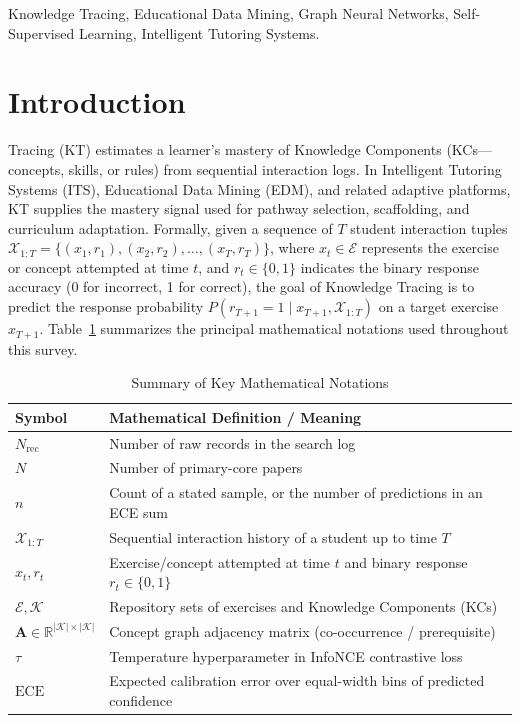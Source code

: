 \documentclass[lettersize,journal]{IEEEtran}
\begin{document}
\begin{IEEEkeywords}
Knowledge Tracing, Educational Data Mining, Graph Neural Networks, Self-Supervised Learning, Intelligent Tutoring Systems.
\end{IEEEkeywords}

\section{Introduction}
\label{sec:intro}

 Tracing (KT) estimates a learner's mastery of Knowledge Components (KCs---concepts, skills, or rules) from sequential interaction logs. In Intelligent Tutoring Systems (ITS), Educational Data Mining (EDM), and related adaptive platforms, KT supplies the mastery signal used for pathway selection, scaffolding, and curriculum adaptation. Formally, given a sequence of $T$ student interaction tuples $\mathcal{X}_{1:T} = \{(x_1, r_1), (x_2, r_2), \dots, (x_T, r_T)\}$, where $x_t \in \mathcal{E}$ represents the exercise or concept attempted at time $t$, and $r_t \in \{0, 1\}$ indicates the binary response accuracy (0 for incorrect, 1 for correct), the goal of Knowledge Tracing is to predict the response probability $P(r_{T+1} = 1 \mid x_{T+1}, \mathcal{X}_{1:T})$ on a target exercise $x_{T+1}$. Table~\ref{tab:notation_summary} summarizes the principal mathematical notations used throughout this survey.
\begin{table}[t]
\caption{Summary of Key Mathematical Notations}
\label{tab:notation_summary}
\centering
\footnotesize
\begin{tabular}{@{}lp{}@{}}
\toprule
\textbf{Symbol} & \textbf{Mathematical Definition / Meaning} \\
\midrule
$N_{\mathrm{rec}}$ & Number of raw records in the search log \\
$N$ & Number of primary-core papers \\
$n$ & Count of a stated sample, or the number of predictions in an ECE sum \\
$\mathcal{X}_{1:T}$ & Sequential interaction history of a student up to time $T$ \\
$x_t, r_t$ & Exercise/concept attempted at time $t$ and binary response $r_t \in \{0,1\}$ \\
$\mathcal{E}, \mathcal{K}$ & Repository sets of exercises and Knowledge Components (KCs) \\
$\mathbf{A} \in \mathbb{R}^{|\mathcal{K}| \times |\mathcal{K}|}$ & Concept graph adjacency matrix (co-occurrence / prerequisite) \\
$\tau$ & Temperature hyperparameter in InfoNCE contrastive loss \\
$\text{ECE}$ & Expected calibration error over equal-width bins of predicted confidence \\
\bottomrule
\end{tabular}
\end{table}
\end{document}
